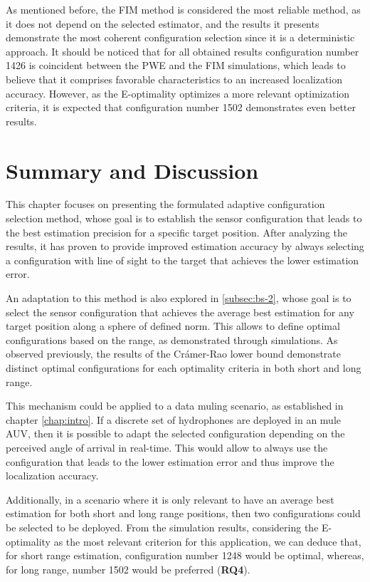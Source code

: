 As mentioned before, the FIM method is considered the most reliable method, as it does not depend on the selected estimator, and the results it presents demonstrate the most coherent configuration selection since it is a deterministic approach.
It should be noticed that for all obtained results configuration number 1426 is coincident between the PWE and the FIM simulations, which leads to believe that it comprises favorable characteristics to an increased localization accuracy. However, as the E-optimality optimizes a more relevant optimization criteria, it is expected that configuration number 1502 demonstrates even better results. 


\section{Summary and Discussion}

This chapter focuses on presenting the formulated adaptive configuration selection method, whose goal is to establish the sensor configuration that leads to the best estimation precision for a specific target position. After analyzing the results, it has proven to provide improved estimation accuracy by always selecting a configuration with line of sight to the target that achieves the lower estimation error. 

An adaptation to this method is also explored in \ref{subsec:bs-2}, whose goal is to select the sensor configuration that achieves the average best estimation for any target position along a sphere of defined norm. This allows to define optimal configurations based on the range, as demonstrated through simulations. As observed previously, the results of the Crámer-Rao lower bound demonstrate distinct optimal configurations for each optimality criteria in both short and long range. 

This mechanism could be applied to a data muling scenario, as established in chapter \ref{chap:intro}. If a discrete set of hydrophones are deployed in an mule AUV, then it is possible to adapt the selected configuration depending on the perceived angle of arrival in real-time. This would allow to always use the configuration that leads to the lower estimation error and thus improve the localization accuracy. 

Additionally, in a scenario where it is only relevant to have an average best estimation for both short and long range positions, then two configurations could be selected to be deployed. From the simulation results, considering the E-optimality as the most relevant criterion for this application, we can deduce that, for short range estimation, configuration number 1248 would be optimal, whereas, for long range, number 1502 would be preferred (\textbf{RQ4}).

